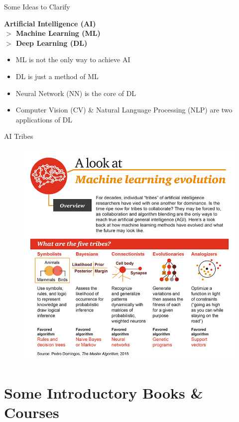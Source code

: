 \documentclass{../TexTemplate/myslide}
\begin{document}
\begin{frame}{Some Ideas to Clarify}
\begin{center}
\textbf{Artificial Intelligence (AI)\\
\qquad $>$ Machine Learning (ML)\\
\qquad\qquad $>$ Deep Learning (DL)}
\end{center}
\begin{itemize}
	\item ML is not the only way to achieve AI
	\item DL is just a method of ML
	\item Neural Network (NN) is the core of DL
	\item Computer Vision (CV) \& Natural Language Processing (NLP) are two applications of DL
\end{itemize}
\end{frame}

\begin{frame}{AI Tribes}
\begin{figure}
\centering
\includegraphics[width=0.6\linewidth]{fig/A-Look-at-Machine-Learning-Evolution.png}
\end{figure}
\end{frame}

\section{Some Introductory Books \& Courses}
\begin{frame}
\sectionpage
\end{frame}
\end{document}
